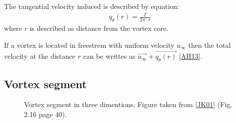\documentclass[letterpaper,10pt,english]{jupyterBook}
\begin{document}
\sphinxAtStartPar
The tangential velocity induced is described by equation:
\begin{equation*}
\begin{split}
q_\theta(r) = \frac{\Gamma}{2\pi \cdot r}
\end{split}
\end{equation*}
\sphinxAtStartPar
where \(r\) is described as distance from the vortex core.

\sphinxAtStartPar
If a vortex is located in free\sphinxhyphen{}strem with uniform velocity \(u_\infty\) then the total velocity at the distance \(r\) can be writtes as \(\overrightarrow{u_\infty} + \overrightarrow{q_\theta(r)}\) {[}\hyperlink{cite.chapters/bibliography:id3}{AH13}{]}.


\subsection{Vortex segment}
\label{\detokenize{chapters/description/theory:vortex-segment}}
\begin{figure}[htbp]
\centering
\capstart

\noindent{}
\caption{Vortex segment in three dimentions. Figure taken from {[}\hyperlink{cite.chapters/bibliography:id4}{JK01}{]} (Fig. 2.16 page 40).}\label{\detokenize{chapters/description/theory:id10}}\end{figure}
\end{document}
